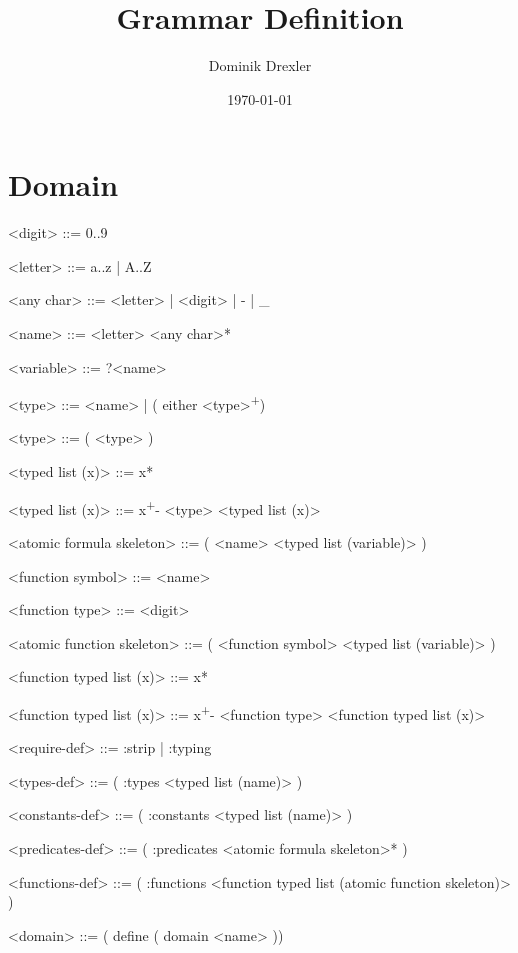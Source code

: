 \documentclass[]{article}
\title{Grammar Definition}
\author{Dominik Drexler}
\date{\today}
\begin{document}
\maketitle

\section{Domain}

\begin{grammar}
    \newcommand{\plus}{\textsuperscript{+}}
    \newcommand{\typing}{\textsuperscript{:typing~}}
    \newcommand{\fluents}{\textsuperscript{:fluents~}}

    <digit> ::= 0..9

    <letter> ::= a..z | A..Z

    <any char> ::= <letter> | <digit> | - | _

    <name> ::= <letter> <any char>*

    <variable> ::= ?<name>



    <type> ::= <name> | ( either <type>\plus )

    <type> ::= ( <type> )

    <typed list (x)> ::= x*

    <typed list (x)> ::= x\plus - <type> <typed list (x)>


    <atomic formula skeleton> ::= ( <name> <typed list (variable)> )



    <function symbol> ::= <name>

    <function type> ::= <digit>

    <atomic function skeleton> ::= ( <function symbol> <typed list (variable)> )

    <function typed list (x)> ::= x*

    <function typed list (x)> ::= x\plus - <function type> <function typed list (x)>



    <require-def> ::= :strip | :typing

    <types-def> ::= ( :types <typed list (name)> )

    <constants-def> ::= ( :constants <typed list (name)> )

    <predicates-def> ::= ( :predicates <atomic formula skeleton>* )

    <functions-def> ::= ( :functions <function typed list (atomic function skeleton)> )

    <domain> ::= ( define ( domain <name> )    )

\end{grammar}

\nocite{mcdermott-et-al-1998}



\end{document}
